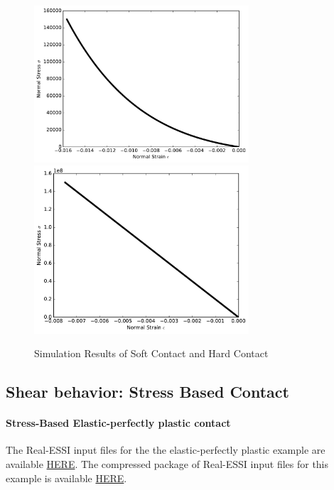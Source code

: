 \begin{figure}[H]
  \centering
  \includegraphics[width = 8cm]{./Figure-files/Day3/Contact_Examples/softcontact.pdf}
  \includegraphics[width = 8cm]{./Figure-files/Day3/Contact_Examples/hardcontact.pdf}
  \caption{Simulation Results of Soft Contact and Hard Contact}
  \label{fig_soft_hard_contact}
\end{figure}






\clearpage
\newpage
\subsection{ Shear behavior: Stress Based Contact }


\paragraph{Stress-Based Elastic-perfectly plastic contact}
The Real-ESSI input files for the the elastic-perfectly plastic example are available 
\href{http://cml01.engr.ucdavis.edu/shortCourse/Day3/Contact_Examples/shear/SoftContact_Elastic_Perfectly_Plastic_Shear_Model}{HERE}. 
The compressed package of Real-ESSI input files for this example is available 
\href{http://cml01.engr.ucdavis.edu/shortCourse/Day3/Contact_Examples/shear/SoftContact_Elastic_Perfectly_Plastic_Shear_Model/SoftContact_Elastic_Perfectly_Plastic_Shear_Model.tgz}{HERE}. 


